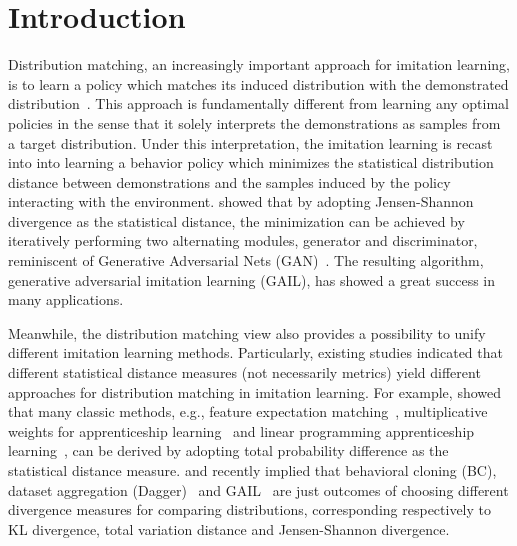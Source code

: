 \section{Introduction}
Distribution matching, 
an increasingly important approach for imitation learning, 
is to learn a policy which matches its induced distribution with the demonstrated distribution~\citep{ho2016generative}.
This approach is fundamentally different from learning any optimal policies in the sense that it solely interprets the demonstrations as samples from a target distribution.
Under this interpretation, the imitation learning is recast into into learning a behavior policy which minimizes the statistical distribution distance between demonstrations and the samples induced by the policy interacting with the environment.
\citet{ho2016generative} showed that by adopting Jensen-Shannon divergence as the statistical distance,
the minimization can be achieved by iteratively performing two alternating modules, generator and discriminator, 
reminiscent of Generative Adversarial Nets (GAN)~\citep{goodfellow2014generative}. 
The resulting algorithm, generative adversarial imitation learning (GAIL), has showed a great success in many applications.  


Meanwhile, the distribution matching view also provides a possibility to unify different imitation learning methods. 
Particularly, existing studies indicated that different statistical distance measures (not necessarily metrics) yield different approaches for distribution matching in imitation learning. 
For example, \citet{ho2016generative} showed that many classic methods, e.g., feature expectation matching~\citep{abbeel2004apprenticeship}, multiplicative weights for apprenticeship learning~\citep{syed2008game} and linear programming apprenticeship learning~\citep{syed2008apprenticeship}, can be derived by adopting total probability difference as the statistical distance measure.
\citet{ke2019imitation} and \citet{ghasemipour2020divergence} recently implied that behavioral cloning (BC), dataset aggregation (Dagger)~\citep{ross2011reduction} and GAIL~\citep{ho2016generative} are just outcomes of choosing different divergence measures for comparing distributions, corresponding respectively to KL divergence, total variation distance and Jensen-Shannon divergence. 


